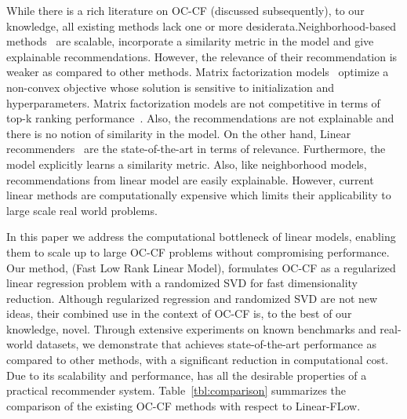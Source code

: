\documentclass{article}
\newcommand{\citep}{\cite}
\begin{document}
While there is a rich literature on OC-CF (discussed subsequently),
to our knowledge, all existing methods lack one
or more desiderata.Neighborhood-based methods~\citep{Sarwar:2001,Linden:2003} are scalable, incorporate a similarity metric in the model and give explainable recommendations. However, the relevance of their recommendation is weaker as compared to other methods. Matrix factorization models~\citep{Hu:2008} optimize a non-convex objective whose solution is sensitive to initialization and hyperparameters. Matrix factorization models are  %
not competitive in terms of top-k ranking performance~\cite{Ning:2011,Sedhain:2016}. Also, the recommendations are not explainable and there is no notion of similarity in the model. On the other hand, Linear recommenders~\cite{Ning:2011,Sedhain:2016} are the state-of-the-art in terms of relevance. Furthermore, the model explicitly learns a similarity metric. Also, like neighborhood models, recommendations from linear model are easily explainable. However, current linear methods are computationally expensive which limits their applicability to large scale real world problems.

In this paper we address the computational bottleneck of linear models, enabling them to scale up to large OC-CF problems without compromising performance. Our method, \LinearLow (Fast Low Rank Linear Model), formulates OC-CF as a regularized linear regression problem with a randomized SVD for fast dimensionality reduction.
Although regularized regression and randomized SVD are not new ideas,  their combined use in the context of OC-CF is,  to the best of our knowledge, novel.
Through extensive experiments on known benchmarks and real-world datasets, we demonstrate that \LinearLow achieves state-of-the-art performance as
compared to other methods, with a significant reduction in computational cost.  Due to its scalability and performance,
\LinearLow has all the desirable properties of a practical recommender system. Table~\ref{tbl:comparison} summarizes the comparison of the existing OC-CF methods with respect to Linear-FLow.
\end{document}
